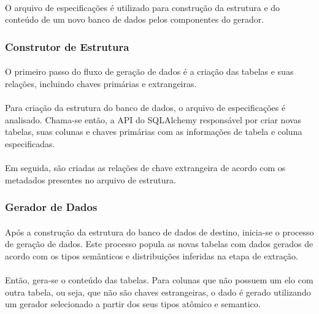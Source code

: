 \paragraph{} O arquivo de especificações é utilizado para construção da estrutura e do conteúdo de um novo banco de dados pelos componentes do gerador.

\subsubsection{Construtor de Estrutura}

\paragraph{} O primeiro passo do fluxo de geração de dados é a criação das tabelas e suas relações, incluindo chaves primárias e extrangeiras.

\paragraph{} Para criação da estrutura do banco de dados, o arquivo de especificações é analisado. Chama-se então, a API do SQLAlchemy responsável por criar novas tabelas, suas colunas e chaves primárias com as informações de tabela e coluna especificadas.

\paragraph{} Em seguida, são criadas as relações de chave extrangeira de acordo com os metadados presentes no arquivo de estrutura.

\subsubsection{Gerador de Dados}

\paragraph{} Após a construção da estrutura do banco de dados de destino, inicia-se o processo de geração de dados. Este processo popula as novas tabelas com dados gerados de acordo com os tipos semânticos e distribuições inferidas na etapa de extração.

\paragraph{} Então, gera-se o conteúdo das tabelas. Para colunas que não possuem um elo com outra tabela, ou seja, que não são chaves estrangeiras, o dado é gerado utilizando um gerador selecionado a partir dos seus tipos atômico e semantico.

